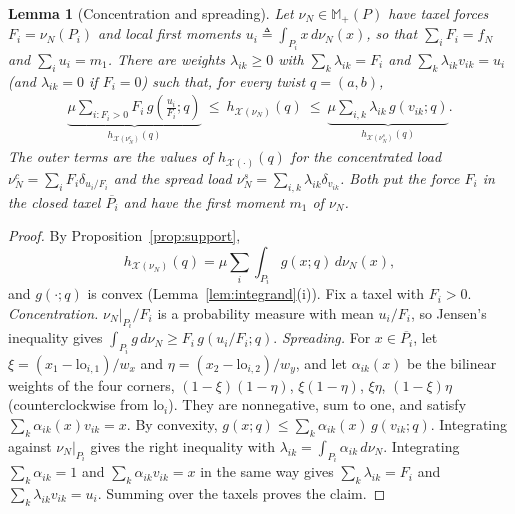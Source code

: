 \documentclass[11pt,a4paper]{article}
\theoremstyle{plain}
\newtheorem{lemma}[theorem]{Lemma}
\newcommand{\X}{\mathcal X}
\begin{document}
\begin{lemma}[Concentration and spreading]
\label{lem:taxel_reduction}
    Let $\nu_N\in\mathbb M_+(P)$ have taxel forces $F_i=\nu_N(P_i)$ and local first moments $u_i\triangleq\int_{P_i}x\,d\nu_N(x)$, so that $\sum_iF_i=f_N$ and $\sum_iu_i=m_1$.
    There are weights $\lambda_{ik}\ge0$ with $\sum_k\lambda_{ik}=F_i$ and $\sum_k\lambda_{ik}v_{ik}=u_i$ (and $\lambda_{ik}=0$ if $F_i=0$) such that, for every twist $q=(a,b)$,
    \begin{align}
        \label{eq:concentrate_spread}
        \underbrace{\mu\sum_{i:F_i>0}F_i\,g\!\left(\tfrac{u_i}{F_i};q\right)}_{h_{\X(\nu_N^{c})}(q)}
        \ \le\ h_{\X(\nu_N)}(q)\ \le\
        \underbrace{\mu\sum_{i,k}\lambda_{ik}\,g(v_{ik};q)}_{h_{\X(\nu_N^{s})}(q)}.
    \end{align}
    The outer terms are the values of $h_{\X(\cdot)}(q)$ for the \emph{concentrated} load $\nu_N^c=\sum_iF_i\delta_{u_i/F_i}$ and the \emph{spread} load $\nu_N^s=\sum_{i,k}\lambda_{ik}\delta_{v_{ik}}$.
    Both put the force $F_i$ in the closed taxel $\overline{P_i}$ and have the first moment $m_1$ of $\nu_N$.
\end{lemma}
\begin{proof}
    By Proposition~\ref{prop:support},
    \[h_{\X(\nu_N)}(q)=\mu\sum_i\int_{P_i}g(x;q)\,d\nu_N(x),\]
    and $g(\cdot;q)$ is convex (Lemma~\ref{lem:integrand}(i)). Fix a taxel with $F_i>0$.
    \textit{Concentration.} $\nu_N|_{P_i}/F_i$ is a probability measure with mean $u_i/F_i$, so Jensen's inequality gives $\int_{P_i}g\,d\nu_N\ge F_i\,g(u_i/F_i;q)$.
    \textit{Spreading.} For $x\in\overline{P_i}$, let $\xi=(x_1-\mathrm{lo}_{i,1})/w_x$ and $\eta=(x_2-\mathrm{lo}_{i,2})/w_y$, and let $\alpha_{ik}(x)$ be the bilinear weights of the four corners,
    $(1-\xi)(1-\eta)$, $\xi(1-\eta)$, $\xi\eta$, $(1-\xi)\eta$ (counterclockwise from $\mathrm{lo}_i$). They are nonnegative, sum to one, and satisfy $\sum_k\alpha_{ik}(x)v_{ik}=x$.
    By convexity, $g(x;q)\le\sum_k\alpha_{ik}(x)\,g(v_{ik};q)$. Integrating against $\nu_N|_{P_i}$ gives the right inequality with
    $\lambda_{ik}=\int_{P_i}\alpha_{ik}\,d\nu_N$. Integrating $\sum_k\alpha_{ik}=1$ and $\sum_k\alpha_{ik}v_{ik}=x$ in the same way gives
    $\sum_k\lambda_{ik}=F_i$ and $\sum_k\lambda_{ik}v_{ik}=u_i$. Summing over the taxels proves the claim.
\end{proof}
\end{document}
